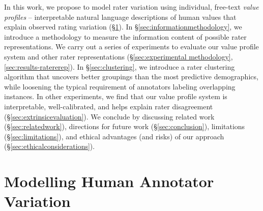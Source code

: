 \documentclass[11pt]{article}
\begin{document}
In this work, we propose to model rater variation using individual, free-text {\em value profiles} -- interpretable natural language descriptions of human values that explain observed rating variation (\S \ref{sec:modellingvariation}).
In \S \ref{sec:informationmethodology}, we introduce a methodology to measure the information content of possible rater representations.
We carry out a series of experiments to evaluate our value profile system and other rater representations (\S \ref{sec:experimental methodology}, \ref{sec:results-ratererep}).
In \S \ref{sec:clustering}, we introduce a rater clustering algorithm that uncovers better groupings than the most predictive demographics, while loosening the typical requirement of annotators labeling overlapping instances.
In other experiments, we find that our value profile system is interpretable, well-calibrated, and helps explain rater disagreement (\S \ref{sec:extrinsicevaluation}).
We conclude by discussing related work (\S \ref{sec:relatedwork}), directions for future work (\S \ref{sec:conclusion}),
limitations (\S \ref{sec:limitations}),
and ethical advantages (and risks) of our approach (\S \ref{sec:ethicalconsiderations}).


\section{Modelling Human Annotator Variation}
\label{sec:modellingvariation}
\end{document}
